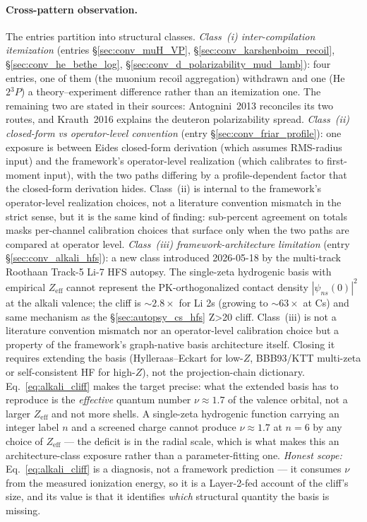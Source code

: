 \documentclass[11pt]{article}
\begin{document}
\paragraph{Cross-pattern observation.}
The entries partition into structural classes.
\emph{Class~(i) inter-compilation itemization} (entries
\S\ref{sec:conv_muH_VP},
\S\ref{sec:conv_karshenboim_recoil},
\S\ref{sec:conv_he_bethe_log},
\S\ref{sec:conv_d_polarizability_mud_lamb}):
four entries, one of them (the muonium recoil aggregation) withdrawn
and one (He $2{}^3P$) a theory--experiment difference rather than an
itemization one.  The remaining two are stated in their sources:
Antognini~2013 reconciles its two routes, and Krauth~2016 explains the
deuteron polarizability spread.  \emph{Class~(ii) closed-form vs
operator-level convention} (entry \S\ref{sec:conv_friar_profile}):
one exposure is between Eides closed-form derivation (which assumes
RMS-radius input) and the framework's operator-level realization
(which calibrates to first-moment input), with the two paths
differing by a profile-dependent factor that the closed-form
derivation hides.  Class~(ii) is internal to the framework's
operator-level realization choices, not a literature convention
mismatch in the strict sense, but it is the same kind of finding:
sub-percent agreement on totals masks per-channel calibration choices
that surface only when the two paths are compared at operator level.
\emph{Class~(iii) framework-architecture limitation} (entry
\S\ref{sec:conv_alkali_hfs}): a new class introduced
2026-05-18 by the multi-track Roothaan Track-5 Li-7 HFS autopsy.
The single-zeta hydrogenic basis with empirical $Z_\text{eff}$ cannot
represent the PK-orthogonalized contact density $|\psi_{ns}(0)|^2$ at
the alkali valence; the cliff is $\sim 2.8\times$ for Li 2s (growing to $\sim 63\times$
at Cs) and same
mechanism as the \S\ref{sec:autopsy_cs_hfs} Z\textgreater 20 cliff.
Class~(iii) is not a literature convention mismatch nor an operator-level
calibration choice but a property of the framework's graph-native
basis architecture itself.  Closing it requires extending the basis
(Hylleraas--Eckart for low-$Z$, BBB93/KTT multi-zeta or self-consistent
HF for high-$Z$), not the projection-chain dictionary.  Eq.~\eqref{eq:alkali_cliff}
makes the target precise: what the extended basis has to reproduce is
the \emph{effective} quantum number $\nu \approx 1.7$ of the valence
orbital, not a larger $Z_\text{eff}$ and not more shells.  A
single-zeta hydrogenic function carrying an integer label $n$ and a
screened charge cannot produce $\nu \approx 1.7$ at $n = 6$ by any
choice of $Z_\text{eff}$ --- the deficit is in the radial scale, which
is what makes this an architecture-class exposure rather than a
parameter-fitting one.  \emph{Honest scope:} Eq.~\eqref{eq:alkali_cliff}
is a diagnosis, not a framework prediction --- it consumes $\nu$ from
the measured ionization energy, so it is a Layer-2-fed account of the
cliff's size, and its value is that it identifies \emph{which}
structural quantity the basis is missing.
\end{document}
